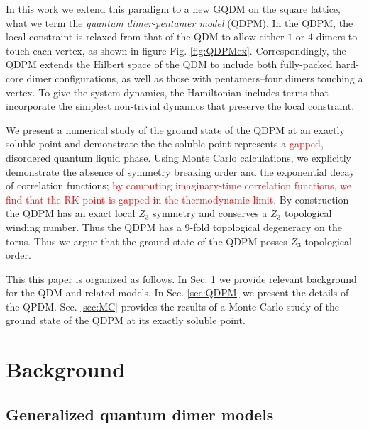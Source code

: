 \documentclass[twocolumn,prb,aps,floatfix,superscriptaddress]{revtex4-1}
\newcommand{\figref}[1]{Fig. \ref{#1}}
\newcommand{\secref}[1]{Sec. \ref{#1}}
\begin{document}
In this work we extend this paradigm to a new GQDM on the square lattice, what we term the \emph{quantum dimer-pentamer model} (QDPM). In the QDPM, the local constraint is relaxed from that of the QDM to allow either $1$ or $4$ dimers to touch each vertex, as shown in figure \figref{fig:QDPMex}. Correspondingly, the QDPM extends the Hilbert space of the QDM to include both fully-packed hard-core dimer configurations, as well as those with pentamers--four dimers touching a vertex. To give the system dynamics, the Hamiltonian includes terms that incorporate the simplest non-trivial dynamics that preserve the local constraint.

We present a numerical study of the ground state of the QDPM at an exactly soluble point and demonstrate the the soluble point represents a \textcolor{red}{gapped}, disordered quantum liquid phase.  Using Monte Carlo calculations, we explicitly demonstrate the absence of symmetry breaking order and the exponential decay of correlation functions; \textcolor{red}{by computing imaginary-time correlation functions, we find that the RK point is gapped in the thermodynamic limit}. By construction the QDPM has an exact local $Z_3$ symmetry and conserves a $Z_3$ topological winding number. Thus the QDPM has a 9-fold topological degeneracy on the torus. Thus we argue that the ground state of the QDPM posses $Z_3$ topological order.

This this paper is organized as follows. In \secref{sec:Background} we provide relevant background for the QDM and related models. In \secref{sec:QDPM} we present the details of the QPDM. \secref{sec:MC} provides the results of a Monte Carlo study of the ground state of the QDPM at its exactly soluble point.


\section{Background}
\label{sec:Background}

\subsection{Generalized quantum dimer models}
\label{sec:GQDM}
\end{document}
